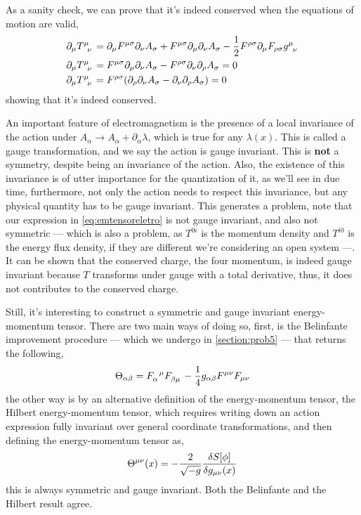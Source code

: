 As a sanity check, we can prove that it's indeed conserved when the equations of motion are valid,
\begin{align}
    \partial_\mu\tensor{T}{^\mu_\nu} &=\partial_\mu F^{\mu\sigma}\partial_\nu A_\sigma+F^{\mu\sigma}\partial_\mu\partial_\nu A_\sigma-\frac12 F^{\rho\sigma}\partial_\mu  F_{\rho\sigma}\tensor{g}{^\mu_\nu}\\
    \partial_\mu\tensor{T}{^\mu_\nu} &=F^{\mu\sigma}\partial_\mu\partial_\nu A_\sigma-  F^{\rho\sigma}\partial_\nu\partial_\rho A_\sigma=0\\
    \partial_\mu\tensor{T}{^\mu_\nu} &=F^{\rho\sigma}\qty(\partial_\rho\partial_\nu A_\sigma- \partial_\nu\partial_\rho A_\sigma)=0
\end{align}
showing that it's indeed conserved.

An important feature of electromagnetism is the presence of a local invariance of the action under $A_\alpha\rightarrow A_\alpha +\partial_\alpha\lambda$, 
which is true for any $\lambda(x)$. This is called a gauge transformation, and we say the action is gauge invariant. 
This is \textbf{not} a symmetry, despite being an invariance of the action. Also, the existence of this invariance 
is of utter importance for the quantization of it, as we'll see in due time, furthermore, not only the action 
needs to respect this invariance, but any physical quantity has to be gauge invariant. This generates a problem, 
note that our expression in \cref{eq:emtensoreletro} is not gauge invariant, and also not symmetric --- which is 
also a problem, as $T^{0i}$ is the momentum density and $T^{i0}$ is the energy flux density, if they are different 
we're considering an open system ---. It can be shown that the conserved charge, the four momentum, is indeed 
gauge invariant because $T$ transforms under gauge with a total derivative, thus, it does not contributes to 
the conserved charge.

Still, it's interesting to construct a symmetric and gauge invariant energy-momentum tensor. There are two main ways 
of doing so, first, is the Belinfante improvement procedure --- which we undergo in \cref{section:prob5} --- that 
returns the following,
\begin{align}
    \Theta_{\alpha\beta}=\tensor{F}{_\alpha^\mu}\tensor{F}{_\beta_\mu}-\frac14 g_{\alpha\beta}F^{\mu\nu}F_{\mu\nu}
\end{align}
the other way is by an alternative definition of the energy-momentum tensor, the Hilbert energy-momentum tensor, which 
requires writing down an action expression fully invariant over general coordinate transformations, and then 
defining the energy-momentum tensor as,
\begin{align}
    \Theta^{\mu\nu}\qty(x) = -\frac{2}{\sqrt{-g}}\fdv{S[\phi]}{g_{\mu\nu}\qty(x)}
\end{align}
this is always symmetric and gauge invariant. Both the Belinfante and the Hilbert result agree.
